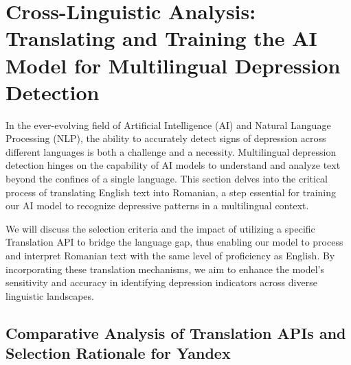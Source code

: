 \chapter{Cross-Linguistic Analysis: Translating and Training the AI Model for Multilingual Depression Detection}
\label{chap:ch3}
\par \quad In the ever-evolving field of Artificial Intelligence (AI) and Natural Language Processing (NLP), the ability to accurately detect signs of depression across different languages is both a challenge and a necessity. Multilingual depression detection hinges on the capability of AI models to understand and analyze text beyond the confines of a single language. This section delves into the critical process of translating English text into Romanian, a step essential for training our AI model to recognize depressive patterns in a multilingual context. 

We will discuss the selection criteria and the impact of utilizing a specific Translation API to bridge the language gap, thus enabling our model to process and interpret Romanian text with the same level of proficiency as English. By incorporating these translation mechanisms, we aim to enhance the model's sensitivity and accuracy in identifying depression indicators across diverse linguistic landscapes.

\section{Comparative Analysis of Translation APIs and Selection Rationale for Yandex}


